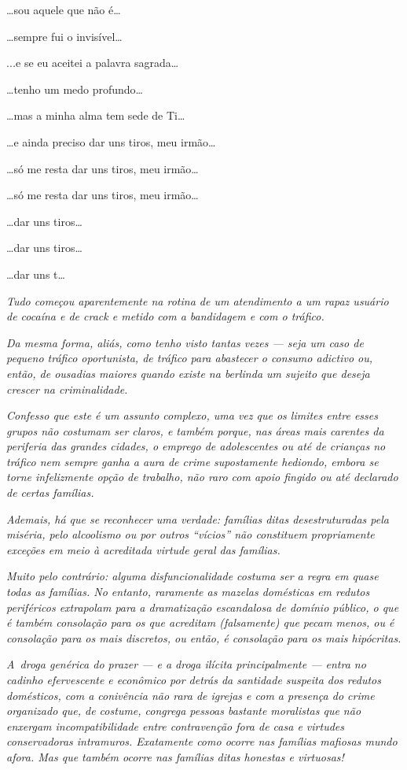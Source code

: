 …sou aquele que não é…

…sempre fui o invisível…

..\emph{.}e se eu aceitei a palavra sagrada…

…tenho um medo profundo…

…mas a minha alma tem sede de Ti…

…e ainda preciso dar uns tiros, meu irmão…

…só me resta dar uns tiros, meu irmão…

…só me resta dar uns tiros, meu irmão…

…dar uns tiros…

…dar uns tiros…

…dar uns
t…

\begin{center}\asterisc{}\end{center}
\begingroup\small

\emph{Tudo começou aparentemente na rotina de um atendimento a um rapaz
usuário de cocaína e de crack e metido com a bandidagem e com o
tráfico.}

\emph{Da mesma forma, aliás, como tenho visto tantas vezes --- seja um
caso de pequeno tráfico oportunista, de tráfico para abastecer o consumo
adictivo ou, então, de ousadias maiores quando existe na berlinda um
sujeito que deseja crescer na criminalidade.}

\emph{Confesso que este é um assunto complexo, uma vez que os limites
entre esses grupos não costumam ser claros, e também porque, nas áreas
mais carentes da periferia das grandes cidades, o emprego de
adolescentes ou até de crianças no tráfico nem sempre ganha a aura de
crime supostamente hediondo, embora se torne infelizmente opção de
trabalho, não raro com apoio fingido ou até declarado de certas
famílias.}

\emph{Ademais, há que se reconhecer uma verdade: famílias ditas
desestruturadas pela miséria, pelo alcoolismo ou por outros ``vícios''
não constituem propriamente exceções em meio à acreditada virtude geral
das famílias.}

\emph{Muito pelo contrário: alguma disfuncionalidade costuma ser a regra
em quase todas as famílias. No entanto, raramente as mazelas domésticas
em redutos periféricos extrapolam para a dramatização escandalosa de
domínio público, o que é também consolação para os que acreditam
(falsamente) que pecam menos, ou é consolação para os mais discretos, ou
então, é consolação para os mais hipócritas.}

\emph{A~droga genérica do prazer --- e a droga ilícita principalmente
--- entra no cadinho efervescente e econômico por detrás da santidade
suspeita dos redutos domésticos, com a conivência não rara de igrejas e
com a presença do crime organizado que, de costume, congrega pessoas
bastante moralistas que não enxergam incompatibilidade entre
contravenção fora de casa e virtudes conservadoras intramuros.
Exatamente como ocorre nas famílias mafiosas mundo afora. Mas que também
ocorre nas famílias ditas honestas e virtuosas!}

